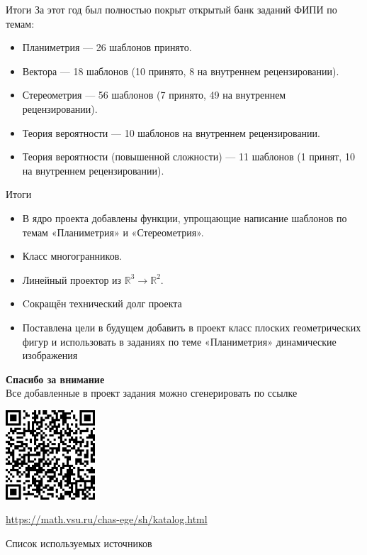 \documentclass[aspectratio=169,12pt]{beamer}
\begin{document}
\begin{frame}{Итоги}
	За этот год был полностью покрыт открытый банк заданий ФИПИ по темам:
	\begin{itemize}
		\item Планиметрия — 26 шаблонов принято.
		\item Вектора — 18 шаблонов (10 принято, 8 на внутреннем рецензировании).
		\item Стереометрия — 56 шаблонов (7 принято, 49 на внутреннем рецензировании).
		\item Теория вероятности — 10 шаблонов на внутреннем рецензировании.
		\item Теория вероятности (повышенной сложности) — 11 шаблонов (1 принят, 10 на внутреннем рецензировании).
	\end{itemize}

\end{frame}

\begin{frame}{Итоги}
	
	\begin{itemize}
		\item В ядро проекта добавлены функции, упрощающие написание шаблонов по темам «Планиметрия» и  «Стереометрия».
		\item Класс многогранников.
		\item Линейный проектор из $\mathbb{R}^3 \to \mathbb{R}^2$.
	\end{itemize}

	\begin{itemize}
		\item Cокращён технический долг проекта
		\item Поставлена цели в будущем добавить в проект класс плоских геометрических фигур и использовать в заданиях по теме «Планиметрия» динамические изображения
	\end{itemize}
\end{frame}

\begin{frame}
	\center\large\textcolor{NordBrightBlue}{\textbf{Спасибо за внимание}}\\
	\hfill \break
	\normalsize
	Все добавленные в проект задания можно сгенерировать по ссылке\\
	\hfill \break

	\includegraphics[width=0.25\textwidth]{QR-code}\\
	\hfill \break

	\url{https://math.vsu.ru/chas-ege/sh/katalog.html}
\end{frame}

\begin{frame}{Список используемых источников}
	
\end{frame}
\end{document}
